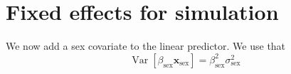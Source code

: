 \begin{Shaded}
\begin{Highlighting}[]
\NormalTok{(}
  \SpecialCharTok{$}\SpecialCharTok{$}\SpecialCharTok{$}
  \SpecialCharTok{$}\SpecialCharTok{$}\SpecialCharTok{$}
   
\NormalTok{)}
\end{Highlighting}
\end{Shaded}

\hypertarget{fixed-effects-for-simulation}{%
\section*{Fixed effects for
simulation}\label{fixed-effects-for-simulation}}

We now add a sex covariate to the linear predictor. We use that \[
\operatorname{Var}[\beta_{\text{sex}}\mathbf{x}_{\text{sex}}] = \beta_{\text{sex}}^2  \sigma^2_\text{sex}
\]

